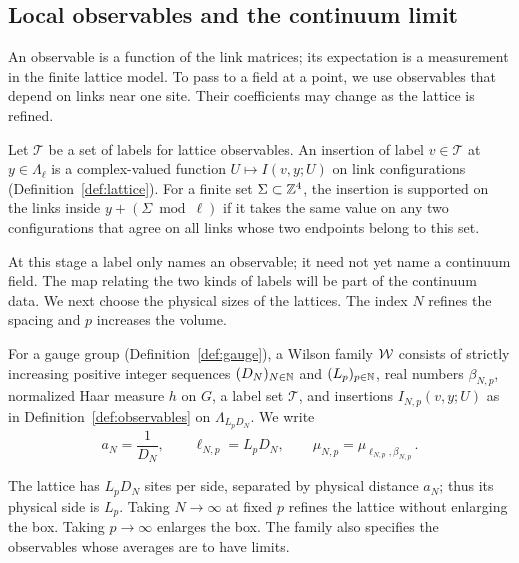 \subsection{Local observables and the continuum limit}\label{subsec:observables}

An observable is a function of the link matrices; its expectation is a measurement in the finite lattice model.
To pass to a field at a point, we use observables that depend on links near one site.
Their coefficients may change as the lattice is refined.

\begin{definition}\label{def:observables}
Let $\mathcal T$ be a set of labels for lattice observables.
An insertion of label $v\in\mathcal T$ at $y\in\Lambda_\ell$ is a complex-valued function $U\mapsto I(v,y;U)$ on link configurations (Definition~\ref{def:lattice}).
For a finite set $\Sigma\subset\mathbb Z^4$, the insertion is supported on the links inside $y+(\Sigma\bmod\ell)$ if it takes the same value on any two configurations that agree on all links whose two endpoints belong to this set.
\end{definition}

At this stage a label only names an observable; it need not yet name a continuum field.
The map relating the two kinds of labels will be part of the continuum data.
We next choose the physical sizes of the lattices.
The index $N$ refines the spacing and $p$ increases the volume.

\begin{definition}\label{def:family}
For a gauge group (Definition~\ref{def:gauge}), a Wilson family $\mathcal W$ consists of strictly increasing positive integer sequences $(D_N)_{N\in\mathbb N}$ and $(L_p)_{p\in\mathbb N}$, real numbers $\beta_{N,p}$, normalized Haar measure $h$ on $G$, a label set $\mathcal T$, and insertions $I_{N,p}(v,y;U)$ as in Definition~\ref{def:observables} on $\Lambda_{L_pD_N}$.
We write
\begin{equation}\label{eq:physical-scales}
a_N=\frac{1}{D_N},\qquad \ell_{N,p}=L_pD_N,\qquad
\mu_{N,p}=\mu_{\ell_{N,p},\beta_{N,p}}\,.
\end{equation}
\end{definition}

The lattice has $L_pD_N$ sites per side, separated by physical distance $a_N$; thus its physical side is $L_p$.
Taking $N\to\infty$ at fixed $p$ refines the lattice without enlarging the box.
Taking $p\to\infty$ enlarges the box.
The family also specifies the observables whose averages are to have limits.

